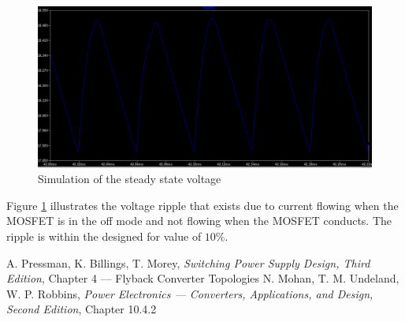\documentclass[a4paper, 12pt]{article}
\begin{document}
\begin{figure}[H]
  \centering
  \includegraphics[width=\textwidth]{images/output_2_sim.png}
  \caption{Simulation of the steady state voltage}
  \label{fig:output_2_sim}
\end{figure}

Figure \ref{fig:output_2_sim} illustrates the voltage ripple that exists due to current flowing when the MOSFET is in the off mode and not flowing when the MOSFET conducts. The ripple is within the designed for value of $10\%$. 
  


\begin{thebibliography}{0}
	 A. Pressman, K. Billings, T. Morey, \textit{Switching Power Supply Design, Third Edition}, Chapter 4 --- Flyback Converter Topologies
	 N. Mohan, T. M. Undeland, W. P. Robbins, \textit{Power Electronics --- Converters, Applications, and Design, Second Edition}, Chapter 10.4.2 
\end{thebibliography}
\end{document}
